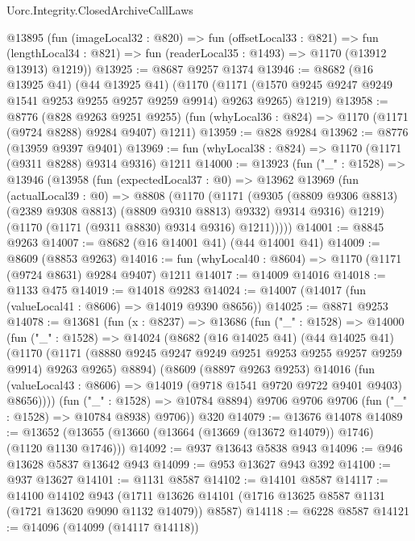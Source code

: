 \begin{lexlean}{Uorc.Integrity.ClosedArchiveCallLaws}
\begin{coremodule}
    @13895
      (fun (imageLocal32 : @820) =>
      fun (offsetLocal33 : @821) =>
      fun (lengthLocal34 : @821) => fun (readerLocal35 : @1493) => @1170 (@13912 @13913) @1219))
@13925 := @8687 @9257 @1374
@13946 := @8682
    (@16 @13925 @41)
    (@44 @13925 @41)
    (@1170 (@1171 (@1570 @9245 @9247 @9249 @1541 @9253 @9255 @9257 @9259 @9914) @9263 @9265) @1219)
@13958 := @8776
    (@828 @9263 @9251 @9255)
    (fun (whyLocal36 : @824) => @1170 (@1171 (@9724 @8288) @9284 @9407) @1211)
@13959 := @828 @9284
@13962 := @8776 (@13959 @9397 @9401)
@13969 := fun (whyLocal38 : @824) => @1170 (@1171 (@9311 @8288) @9314 @9316) @1211
@14000 := @13923
    (fun ("_" : @1528) =>
    @13946
      (@13958
        (fun (expectedLocal37 : @0) =>
        @13962
          @13969
          (fun (actualLocal39 : @0) =>
          @8808
            (@1170
              (@1171
                (@9305 (@8809 @9306 @8813) (@2389 @9308 @8813) (@8809 @9310 @8813) @9332)
                @9314
                @9316)
              @1219)
            (@1170 (@1171 (@9311 @8830) @9314 @9316) @1211)))))
@14001 := @8845 @9263
@14007 := @8682 (@16 @14001 @41) (@44 @14001 @41)
@14009 := @8609 (@8853 @9263)
@14016 := fun (whyLocal40 : @8604) => @1170 (@1171 (@9724 @8631) @9284 @9407) @1211
@14017 := @14009 @14016
@14018 := @1133 @475
@14019 := @14018 @9283
@14024 := @14007 (@14017 (fun (valueLocal41 : @8606) => @14019 @9390 @8656))
@14025 := @8871 @9253
@14078 := @13681
    (fun (x : @8237) =>
    @13686
      (fun ("_" : @1528) =>
      @14000
        (fun ("_" : @1528) =>
        @14024
          (@8682
            (@16 @14025 @41)
            (@44 @14025 @41)
            (@1170
              (@1171 (@8880 @9245 @9247 @9249 @9251 @9253 @9255 @9257 @9259 @9914) @9263 @9265)
              @8894)
            (@8609
              (@8897 @9263 @9253)
              @14016
              (fun (valueLocal43 : @8606) => @14019 (@9718 @1541 @9720 @9722 @9401 @9403) @8656))))
        (fun ("_" : @1528) => @10784 @8894)
        @9706
        @9706
        @9706
        (fun ("_" : @1528) => @10784 @8938)
        @9706))
    @320
@14079 := @13676 @14078
@14089 := @13652 (@13655 (@13660 (@13664 (@13669 (@13672 @14079)) @1746) (@1120 @1130 @1746)))
@14092 := @937 @13643 @5838 @943
@14096 := @946 @13628 @5837 @13642 @943
@14099 := @953 @13627 @943 @392
@14100 := @937 @13627
@14101 := @1131 @8587
@14102 := @14101 @8587
@14117 := @14100
    @14102
    @943
    (@1711 @13626 @14101 (@1716 @13625 @8587 @1131 (@1721 @13620 @9090 @1132 @14079)) @8587)
@14118 := @6228 @8587
@14121 := @14096 (@14099 (@14117 @14118))

\end{coremodule}
\end{lexlean}
